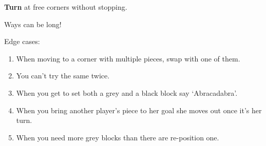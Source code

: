     
    \textbf{Turn} at free corners without stopping. 

    Ways can be long!
    
    

  

    \skipper

\raggedright

\vspace{5ex}

Edge cases:

    \begin{enumerate}
        \item When moving to a corner with multiple pieces, swap with one of them.
        \item You can't try the same twice.
        \item When you get to set both a grey and a black block say `Abracadabra'.
        \item When you bring another player's piece to her goal she moves out once it's her turn.
        \item When you need more grey blocks than there are re-position one.
    \end{enumerate}

\hrulefill






